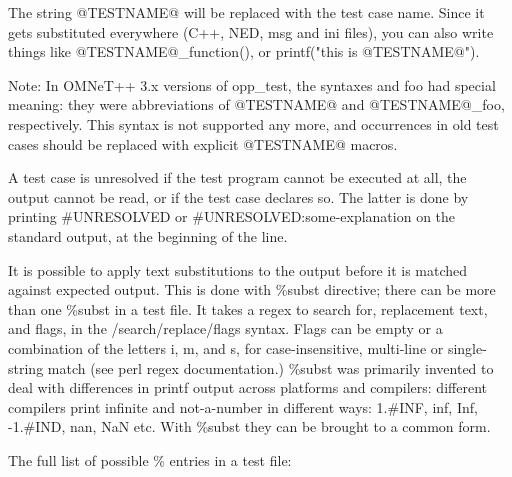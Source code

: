 The string @TESTNAME@ will be replaced with the test case name. Since it
gets substituted everywhere (C++, NED, msg and ini files), you can also
write things like @TESTNAME@\_function(), or printf("this is @TESTNAME@").

Note: In OMNeT++ 3.x versions of opp\_test, the syntaxes {} and {foo} had
special meaning: they were abbreviations of @TESTNAME@ and @TESTNAME@\_foo,
respectively. This syntax is not supported any more, and occurrences in old
test cases should be replaced with explicit @TESTNAME@ macros.

A test case is unresolved if the test program cannot be executed at all, the
output cannot be read, or if the test case declares so. The latter is done
by printing \#UNRESOLVED or \#UNRESOLVED:some-explanation on the standard
output, at the beginning of the line.

It is possible to apply text substitutions to the output before it is matched
against expected output. This is done with \%subst directive; there can be
more than one \%subst in a test file. It takes a regex to search for,
replacement text, and flags, in the /search/replace/flags syntax. Flags
can be empty or a combination of the letters i, m, and s, for case-insensitive,
multi-line or single-string match (see perl regex documentation.) \%subst
was primarily invented to deal with differences in printf output across
platforms and compilers: different compilers print infinite and not-a-number
in different ways: 1.\#INF, inf, Inf, -1.\#IND, nan, NaN etc. With \%subst
they can be brought to a common form.

The full list of possible \% entries in a test file:

